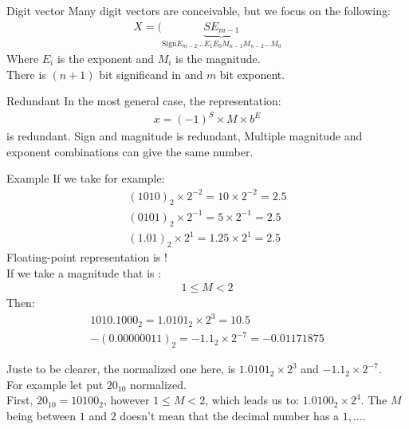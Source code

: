     \begin{parag}{Digit vector}
        Many digit vectors are conceivable,  but we focus on the following:
        \begin{align*}
        X = ( \underbrace{SE_{m-1}}_{ \text{Sign}E_{m-2} \dots E_1 E_0 M_{n-1}M_{n-2} \dots M_0}
        \end{align*}
        Where $E_i$ is the exponent and $M_i$ is the magnitude.\\
        There is $(n+1)$ bit significand in  and $m$ bit exponent.
        
    
    \end{parag}
   \begin{parag}{Redundant}
       In the most general case, the representation: 
       \begin{align*}
           x = (-1)^S \times M \times b^E
       \end{align*}
       is redundant. Sign and magnitude is redundant, Multiple magnitude and exponent combinations can give the same number.
       \\
       \begin{subparag}{Example}
           If we take for example:
           \begin{align*}
               (1010)_2 \times 2^{-2} = 10 \times 2^{-2} = 2.5\\
               (0101)_2 \times 2^{-1} = 5 \times 2^{-1} = 2.5 \\
               (1.01)_2 \times 2^1 = 1.25 \times 2^1 = 2.5
           \end{align*}
           Floating-point representation is  !
           \\
           If we take a magnitude that is :
           \begin{align*}
               1 \leq M < 2
           \end{align*}
           Then: \begin{align*}
               1010.1000_2 = 1.0101_2 \times 2^3 = 10.5 \\
               -(0.00000011)_2 = -1.1_2 \times 2^{-7} = -0.01171875
           \end{align*}
          \begin{framedremark}
              Juste to be clearer, the normalized one here, is $1.0101_2 \times 2^3$ and $-1.1_2 \times 2^{-7}$. 
              \\
              For example let put $20_{10}$ normalized.
              \\
              First, $20_{10} = 10100_2$, however $ 1 \leq M < 2$, which leads us to: $1.0100_2 \times 2^4$. The $M$ being between $1$ and $2$ doesn't mean that the decimal number has a $1, \dots$.
          \end{framedremark}
       \end{subparag}
       
   
   \end{parag}
    
